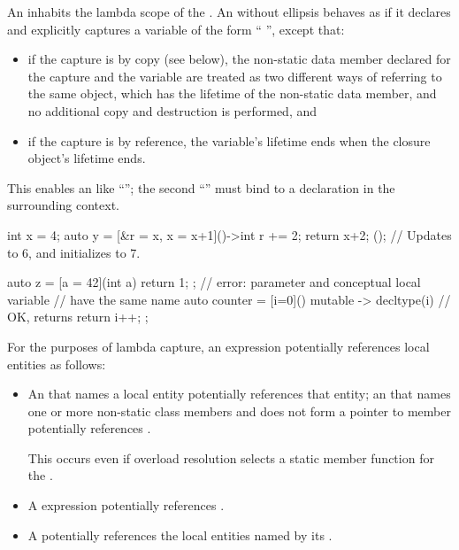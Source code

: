\pnum
An  inhabits
the lambda scope
of the .
An  without ellipsis
behaves as if it declares and explicitly captures a variable of
the form ``  \tcode{;}'', except that:
\begin{itemize}
\item if the capture is by copy (see below), the non-static data member
declared for the capture and the variable are treated as two different ways
of referring to the same object, which has the lifetime of the non-static
data member, and no additional copy and destruction is performed, and
\item if the capture is by reference, the variable's lifetime ends when the
closure object's lifetime ends.
\end{itemize}
\begin{note}
This enables an  like
``''; the second ``'' must bind to a
declaration in the surrounding context.
\end{note}
\begin{example}
\begin{codeblock}
int x = 4;
auto y = [&r = x, x = x+1]()->int {
            r += 2;
            return x+2;
         }();                               // Updates  to 6, and initializes  to 7.

auto z = [a = 42](int a) { return 1; };     // error: parameter and conceptual local variable
                                            // have the same name
auto counter = [i=0]() mutable -> decltype(i) {     // OK, returns 
  return i++;
};
\end{codeblock}
\end{example}

\pnum
For the purposes of lambda capture,
an expression potentially references local entities as follows:

\begin{itemize}
\item
An  that names a local entity
potentially references that entity;
an  that names
one or more non-static class members
and does not form a pointer to member
potentially references .
\begin{note}
This occurs even if overload resolution
selects a static member function for the .
\end{note}

\item
A  expression potentially references .

\item
A  potentially references
the local entities named by its .
\end{itemize}

